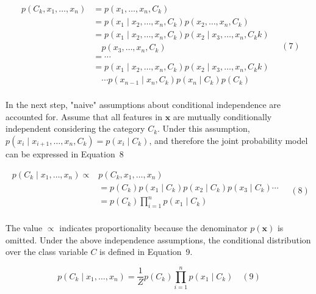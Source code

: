 \documentclass[preprint,12pt]{elsarticle}
\begin{document}
\begin{equation}
	\begin{aligned}
        p(C_{k},x_{1},\ldots,x_{n}) &= p(x_{1},\ldots,x_{n},C_{k}) \\
        &= p(x_{1}\mid x_{2}, \ldots,x_{n},C_{k}) p(x_{2},\ldots,x_{n},C_{k}) \\
        &= p(x_{1}\mid x_{2}, \ldots,x_{n},C_{k}) p(x_{2}\mid x_{3}, \ldots,x_{n},C_{k} {k}) \\
        &\quad p(x_{3},\ldots,x_{n},C_{k}) \\
        &= \cdots \\
        &= p(x_{1}\mid x_{2}, \ldots,x_{n},C_{k}) p(x_{2}\mid x_{3}, \ldots,x_{n},C_{k} {k}) \\
        &\quad \cdots p(x_{n-1}\mid x_{n},C_{k}) p(x_{n}\mid C_{k}) p(C_{k})\\
    \end{aligned}
	\quad\left(7\right)
\end{equation}

In the next step, "naive" assumptions about conditional independence are accounted for. Assume that all features in $\mathbf{x}$ are mutually conditionally independent considering the category $C_{k}$. Under this assumption, $p(x_{i}\mid x_{i+1}, \ldots,x_{n},C_{k}) = p(x_{i}\mid C_{k})$, and therefore the joint probability model can be expressed in Equation~8

\begin{equation}
	\begin{aligned}
        p(C_{k}\mid x_{1},\ldots,x_{n}) \propto &p(C_{k}, x_{1},\ldots,x_{n}) \\
        &= p(C_{k})p(x_{1}\mid C_{k}) p(x_{2}\mid C_{k}) p(x_{3}\mid C_{k}) \cdots \\
        &= p(C_{k}) \prod_{i=1}^{n} p(x_{1}\mid C_{k}) \\
    \end{aligned}
	\quad\left(8\right)
\end{equation}

The value $\propto$ indicates proportionality because the denominator $p({\mathbf{x}})$ is omitted. Under the above independence assumptions, the conditional distribution over the class variable $C$ is defined in Equation~9.

\begin{equation}
	p(C_{k}\mid x_{1},\ldots,x_{n}) = \frac{1}{Z} p(C_{k}) \prod_{i=1}^{n} p(x_{1}\mid C_{k})
	\quad\left(9\right)
\end{equation}
\end{document}
